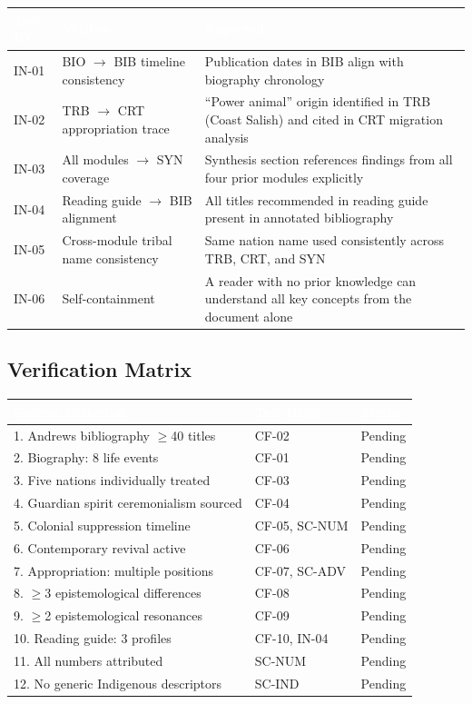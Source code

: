 \documentclass[11pt,letterpaper]{article}
\newcommand{\tableheader}[1]{\textbf{\sffamily\textcolor{white}{#1}}}
\begin{document}
\begin{center}
\begin{tabularx}{\textwidth}{C{1.5cm}L{3.5cm}X}
\toprule
{}
\tableheader{Test ID} & \tableheader{Verifies} & \tableheader{Expected} \\
\midrule
IN-01 & BIO $\rightarrow$ BIB timeline consistency & Publication dates in BIB align with biography chronology \\
IN-02 & TRB $\rightarrow$ CRT appropriation trace & ``Power animal'' origin identified in TRB (Coast Salish) and cited in CRT migration analysis \\
IN-03 & All modules $\rightarrow$ SYN coverage & Synthesis section references findings from all four prior modules explicitly \\
IN-04 & Reading guide $\rightarrow$ BIB alignment & All titles recommended in reading guide present in annotated bibliography \\
IN-05 & Cross-module tribal name consistency & Same nation name used consistently across TRB, CRT, and SYN \\
IN-06 & Self-containment & A reader with no prior knowledge can understand all key concepts from the document alone \\
\bottomrule
\end{tabularx}
\end{center}

\subsection{Verification Matrix}

\begin{center}
\begin{tabularx}{\textwidth}{XL{3.5cm}C{1.5cm}}
\toprule
{}
\tableheader{Success Criterion} & \tableheader{Test ID(s)} & \tableheader{Status} \\
. Andrews bibliography $\geq$40 titles & CF-02 & Pending \\
2. Biography: 8 life events & CF-01 & Pending \\
3. Five nations individually treated & CF-03 & Pending \\
4. Guardian spirit ceremonialism sourced & CF-04 & Pending \\
5. Colonial suppression timeline & CF-05, SC-NUM & Pending \\
6. Contemporary revival active & CF-06 & Pending \\
7. Appropriation: multiple positions & CF-07, SC-ADV & Pending \\
8. $\geq$3 epistemological differences & CF-08 & Pending \\
9. $\geq$2 epistemological resonances & CF-09 & Pending \\
10. Reading guide: 3 profiles & CF-10, IN-04 & Pending \\
11. All numbers attributed & SC-NUM & Pending \\
12. No generic Indigenous descriptors & SC-IND & Pending \\
\bottomrule
\end{tabularx}
\end{center}
\end{document}
